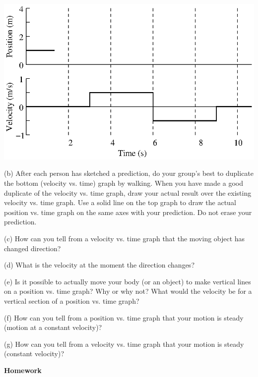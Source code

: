\vspace{0.3cm}
{\par\centering \includegraphics{relating/relating_fig2.eps} \par}
\vspace{0.3cm}

(b) After each person has sketched a prediction, do your group's best to duplicate the bottom (velocity vs. time) graph by walking. When you have made a good duplicate of the velocity vs. time graph, draw your actual result over the existing velocity vs. time graph. Use a solid line on the top graph to draw the actual position vs. time graph on the same axes with your prediction. Do not erase your prediction.

(c) How can you tell from a velocity vs. time graph that the moving object has
changed direction?
\vspace{10mm}

(d) What is the velocity at the moment the direction changes? 
\vspace{10mm}

(e) Is it possible to actually move your body (or an object) to make vertical
lines on a position vs. time graph? Why or why not? What would the velocity
be for a vertical section of a position vs. time graph? 
\vspace{10mm}

(f) How can you tell from a position vs. time graph that your motion is steady
(motion at a constant velocity)? 
\vspace{10mm}

(g) How can you tell from a velocity vs. time graph that your motion is steady
(constant velocity)? 
\vspace{10mm}

\textbf{Homework} 

